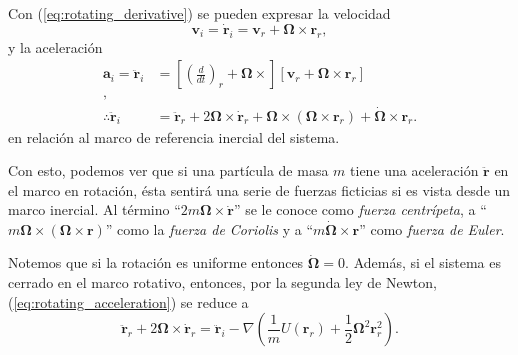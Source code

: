 Con (\ref{eq:rotating_derivative}) se pueden expresar la velocidad
\begin{equation}
 \mathbf{v}_i = \dot{\mathbf{r}}_i = \mathbf{v}_r + \mathbf{\Omega} \times \mathbf{r}_r,
 \label{eq:rotating_velocity}
\end{equation}
y la aceleración
\begin{align}
 \mathbf{a}_i = \ddot{\mathbf{r}}_i &= \left[ \left( \frac{d}{dt}\right)_r + \mathbf{\Omega} \times \right]\left[ \mathbf{v}_r + \mathbf{\Omega} \times \mathbf{r}_r \right] \nonumber \\
 \nonumber, \\
 \therefore \ddot{\mathbf{r}}_i &= \ddot{\mathbf{r}}_r + 2\mathbf{\Omega} \times \mathbf{\dot{r}}_r + \mathbf{\Omega} \times \left( \mathbf{\Omega} \times \mathbf{r}_r \right) + \dot{\mathbf{\Omega}} \times \mathbf{r}_r.
 \label{eq:rotating_acceleration}
\end{align}
en relación al marco de referencia inercial del sistema.

Con esto, podemos ver que si una partícula de masa $m$ tiene una aceleración $\ddot{\mathbf{r}}$ en el marco en rotación, ésta sentirá una serie de fuerzas ficticias si es vista desde un marco inercial. Al término ``$2 m \mathbf{\Omega} \times \dot{\mathbf{r}}$'' se le conoce como \textit{fuerza centrípeta}, a ``$m \mathbf{\Omega} \times ( \mathbf{\Omega} \times \mathbf{r} )$'' como la \textit{fuerza de Coriolis} y a ``$m \dot{\mathbf{\Omega}} \times \mathbf{r}$'' como \textit{fuerza de Euler}.

Notemos que si la rotación es uniforme entonces $\dot{\mathbf{\Omega}} = 0$. Además, si el sistema es cerrado en el marco rotativo, entonces, por la segunda ley de Newton, (\ref{eq:rotating_acceleration}) se reduce a
\begin{equation}
 \ddot{\mathbf{r}}_r + 2\mathbf{\Omega} \times \dot{\mathbf{r}}_r = \ddot{\mathbf{r}}_i - \nabla \left( \frac{1}{m}U(\mathbf{r}_r) +  \frac{1}{2} \mathbf{\Omega}^2 \mathbf{r}_r^2 \right).
 \label{eq:rotating_constant_acceleration}
\end{equation}



